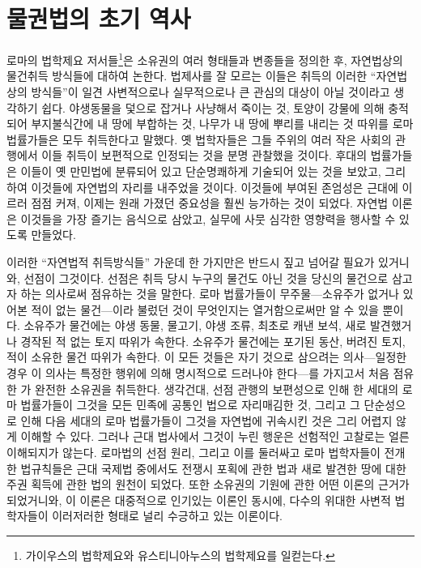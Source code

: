 \chapter{물권법의 초기 역사}

로마의 법학제요 저서들\footnote{%
  가이우스의 법학제요와 유스티니아누스의 법학제요를 일컫는다.
}은
소유권의 여러 형태들과 변종들을 정의한 후,
자연법상의 물건취득 방식들에 대하여 논한다.
법제사를 잘 모르는 이들은
취득의 이러한 ``자연법상의 방식들''이
일견
사변적으로나 실무적으로나 큰 관심의 대상이 아닐 것이라고
생각하기 쉽다.
야생동물을 덫으로 잡거나 사냥해서 죽이는 것,
토양이 강물에 의해 충적되어 부지불식간에
내 땅에 부합하는 것,
나무가 내 땅에 뿌리를 내리는 것 따위를
로마 법률가들은 모두  취득한다고 말했다.
옛 법학자들은
그들 주위의 여러 작은 사회의 관행에서
이들 취득이
보편적으로 인정되는 것을 분명 관찰했을 것이다.
후대의 법률가들은
이들이 옛 만민법에 분류되어 있고
단순명쾌하게 기술되어 있는 것을 보았고, 그리하여
이것들에
자연법의 자리를
내주었을 것이다.
이것들에 부여된 존엄성은 근대에 이르러 점점 커져,
이제는 원래 가졌던 중요성을 훨씬 능가하는 것이 되었다.
자연법 이론은 이것들을 가장 즐기는 음식으로 삼았고,
실무에 사뭇 심각한 영향력을 행사할 수 있도록 만들었다.

이러한 ``자연법적 취득방식들'' 가운데
한 가지만은 반드시 짚고 넘어갈 필요가 있거니와,
선점이 그것이다.
선점은
취득 당시 누구의 물건도 아닌 것을
당신의 물건으로 삼고자 하는 의사로써
점유하는 것을 말한다.
로마 법률가들이 무주물---소유주가
없거나 있어본 적이 없는 물건---이라 불렀던
것이 무엇인지는 열거함으로써만 알 수 있을 뿐이다.
소유주가  물건에는
야생 동물, 물고기, 야생 조류, 최초로 캐낸 보석,
새로 발견했거나 경작된 적 없는 토지 따위가 속한다.
소유주가  물건에는
포기된 동산, 버려진 토지,
적이 소유한 물건 따위가 속한다.
이 모든 것들은
자기 것으로 삼으려는 의사---일정한 경우 이 의사는
특정한 행위에 의해 명시적으로 드러나야 한다---를 가지고서 처음 점유한
가 완전한 소유권을 취득한다.
생각건대,
선점 관행의 보편성으로 인해
한 세대의 로마 법률가들이 그것을 모든 민족에 공통인 법으로
자리매김한 것,
그리고 그 단순성으로 인해
다음 세대의 로마 법률가들이 그것을 자연법에 귀속시킨 것은
그리 어렵지 않게 이해할 수 있다.
그러나 근대 법사에서 그것이 누린 행운은
선험적인 고찰로는 얼른 이해되지가 않는다.
로마법의 선점 원리, 그리고 이를 둘러싸고 로마 법학자들이 전개한 법규칙들은
근대 국제법 중에서도
전쟁시 포획에 관한 법과
새로 발견한 땅에 대한 주권 획득에 관한 법의
원천이 되었다.
또한 소유권의 기원에 관한 어떤 이론의 근거가 되었거니와,
이 이론은 대중적으로 인기있는 이론인 동시에,
다수의 위대한 사변적 법학자들이
이러저러한 형태로
널리 수긍하고 있는 이론이다.

